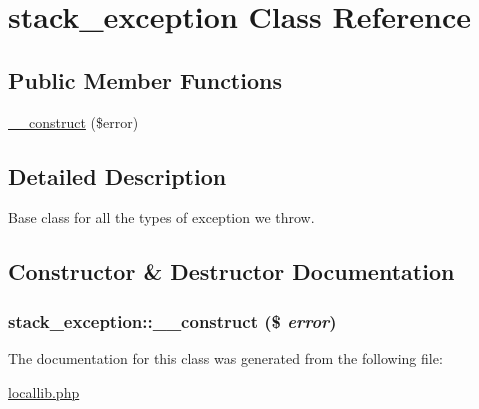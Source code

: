 \hypertarget{classstack__exception}{
\section{stack\_\-exception Class Reference}
\label{classstack__exception}
}
\subsection*{Public Member Functions}
\begin{DoxyCompactItemize}
\item 
\hyperlink{classstack__exception_ad1bf07a718502d7ac9a3552dcef4bef0}{\_\-\_\-construct} (\$error)
\end{DoxyCompactItemize}


\subsection{Detailed Description}
Base class for all the types of exception we throw. 

\subsection{Constructor \& Destructor Documentation}
\hypertarget{classstack__exception_ad1bf07a718502d7ac9a3552dcef4bef0}{
\subsubsection[{\_\-\_\-construct}]{\setlength{\rightskip}{0pt plus 5cm}stack\_\-exception::\_\-\_\-construct (\$ {\em error})}}
\label{classstack__exception_ad1bf07a718502d7ac9a3552dcef4bef0}


The documentation for this class was generated from the following file:\begin{DoxyCompactItemize}
\item 
\hyperlink{locallib_8php}{locallib.php}\end{DoxyCompactItemize}
